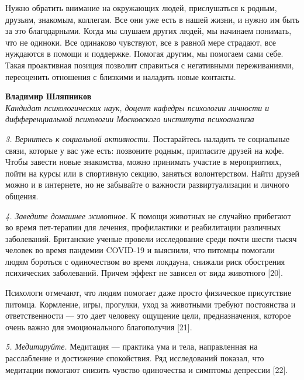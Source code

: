 \begin{fancyquotes}
    Нужно обратить внимание на окружающих людей,
    прислушаться к родным, друзьям, знакомым, коллегам.
    Все они уже есть в нашей жизни, и нужно им быть за это благодарными.
    Когда мы слушаем других людей, мы начинаем понимать, что не одиноки.
    Все одинаково чувствуют, все в равной мере страдают,
    все нуждаются в помощи и поддержке.
    Помогая другим, мы помогаем сами себе.
    Такая проактивная позиция позволит справиться с негативными
    переживаниями, переоценить отношения с близкими
    и наладить новые контакты.

    \begin{flushright}
        \textbf{Владимир Шляпников}\\
        \textit{Кандидат психологических наук,
            доцент кафедры психологии личности и дифференциальной
            психологии Московского института психоанализа}
    \end{flushright}
\end{fancyquotes}


\textit{3. Вернитесь к социальной активности.}
Постарайтесь наладить те социальные связи, которые у вас уже есть:
позвоните родным, пригласите друзей на кофе.
Чтобы завести новые знакомства, можно принимать участие в мероприятиях,
пойти на курсы или в спортивную секцию, заняться волонтерством.
Найти друзей можно и в интернете, но не забывайте о важности
развиртуализации и личного общения.

\textit{4. Заведите домашнее животное.}
К помощи животных не случайно прибегают во время пет-терапии
для лечения, профилактики и реабилитации различных заболеваний.
Британские ученые провели исследование среди почти шести тысяч
человек во время пандемии COVID-19 и выяснили, что питомцы
помогали людям бороться с одиночеством во время локдауна,
снижали риск обострения психических заболеваний.
Причем эффект не зависел от вида животного [20].

Психологи отмечают, что людям помогает даже просто физическое
присутствие питомца. Кормление, игры, прогулки, уход за животными
требуют постоянства и ответственности --- это дает человеку ощущение
цели, предназначения, которое очень важно для эмоционального благополучия [21].

\textit{5. Медитируйте.}
Медитация --- практика ума и тела, направленная на расслабление
и достижение спокойствия. Ряд исследований показал, что медитации
помогают снизить чувство одиночества и симптомы депрессии [22].


